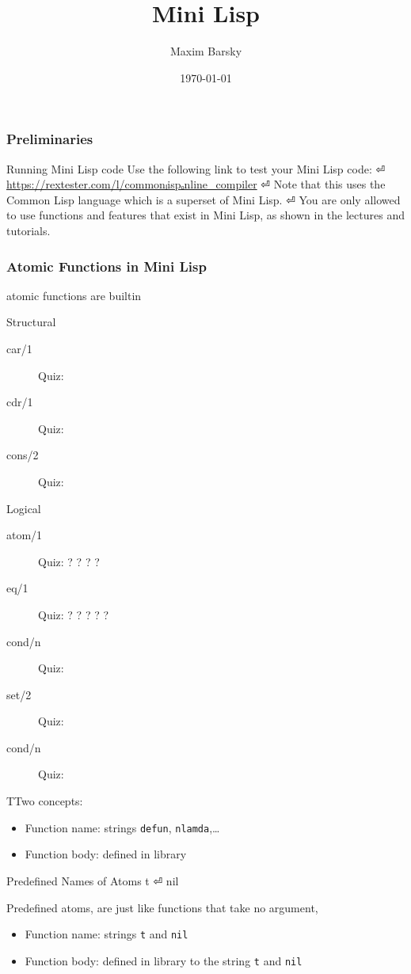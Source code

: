 \documentclass[fleqn]{beamer}
\title{Mini Lisp}
\author{Maxim Barsky}
\institute[Programming Languages- 236319]{Programming Languages⏎ 236319}
\date{\today}
\begin{document}
\setLTR
\begin{frame}
  \titlepage
\end{frame}

\begin{frame}
  \frametitle{Preliminaries}
  \begin{block}{Running Mini Lisp code}
  Use the following link to test your Mini Lisp code: ⏎
  \url{https://rextester.com/l/commonₗispₒnline_compiler} ⏎
  Note that this uses the Common Lisp language which is a superset of Mini Lisp. ⏎
  You are only allowed to use functions and features that exist in Mini Lisp, as shown in the lectures and tutorials.
  \end{block}
\end{frame}

\begin{frame}
  \frametitle{Atomic Functions in Mini Lisp}{atomic functions are builtin}
  \begin{block}{Structural}
  \begin{description}
      \item[car/1] Quiz: 
      \item[cdr/1] Quiz: 
      \item[cons/2] Quiz: 
      \end{description}
  \end{block}
  \begin{block}{Logical}
  \begin{description}
      \item[atom/1] Quiz: ?  ?
          ?  ?
      \item[eq/1] Quiz:  ? ? ? ? 
      ?
      \item[cond/n] Quiz: 
  \end{description}
  \begin{description}
      \item[set/2] Quiz: 
      \item[cond/n] Quiz: 
  \end{description}
   \end{block}
  TTwo concepts:
  \begin{itemize}
   \item Function name: strings \texttt{defun}, \texttt{nlamda},…
   \item Function body: defined in library
  \end{itemize}
  \pause
  \begin{block}{Predefined Names of Atoms}
    t ⏎
    nil
  \end{block}
  Predefined atoms, are just like functions that take no argument,
  \begin{itemize}
   \item Function name: strings \texttt{t} and \texttt{nil}
   \item Function body: defined in library to the string \texttt{t} and \texttt{nil}
  \end{itemize}
\end{frame}
\end{document}
